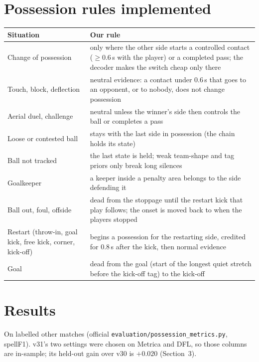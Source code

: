 \documentclass[11pt,a4paper]{article}
\newcommand{\code}[1]{\texttt{#1}}
\newcommand{\st}[1]{\textbf{#1}}
\begin{document}
\section{Possession rules implemented}

\begin{center}\small
\begin{tabularx}{\linewidth}{@{}P{3.7cm} L@{}}
\toprule
\st{Situation} & \st{Our rule} \\
\midrule
Change of possession & only where the other side starts a controlled contact ($\geq0.6$\,s with the
player) or a completed pass; the decoder makes the switch cheap only there \\
Touch, block, deflection & neutral evidence: a contact under 0.6\,s that goes to an opponent, or to
nobody, does not change possession \\
Aerial duel, challenge & neutral unless the winner's side then controls the ball or completes a pass \\
Loose or contested ball & stays with the last side in possession (the chain holds its state) \\
Ball not tracked & the last state is held; weak team-shape and tag priors only break long silences \\
Goalkeeper & a keeper inside a penalty area belongs to the side defending it \\
Ball out, foul, offside & dead from the stoppage until the restart kick that play follows; the onset
is moved back to when the players stopped \\
Restart (throw-in, goal kick, free kick, corner, kick-off) & begins a possession for the restarting
side, credited for 0.8\,s after the kick, then normal evidence \\
Goal & dead from the goal (start of the longest quiet stretch before the kick-off tag) to the kick-off \\
\bottomrule
\end{tabularx}
\end{center}

\section{Results}

On labelled other matches (official \code{evaluation/possession\_metrics.py}, spellF1). v31's two
settings were chosen on Metrica and DFL, so those columns are in-sample; its held-out gain over v30
is $+0.020$ (Section~3).
\end{document}
